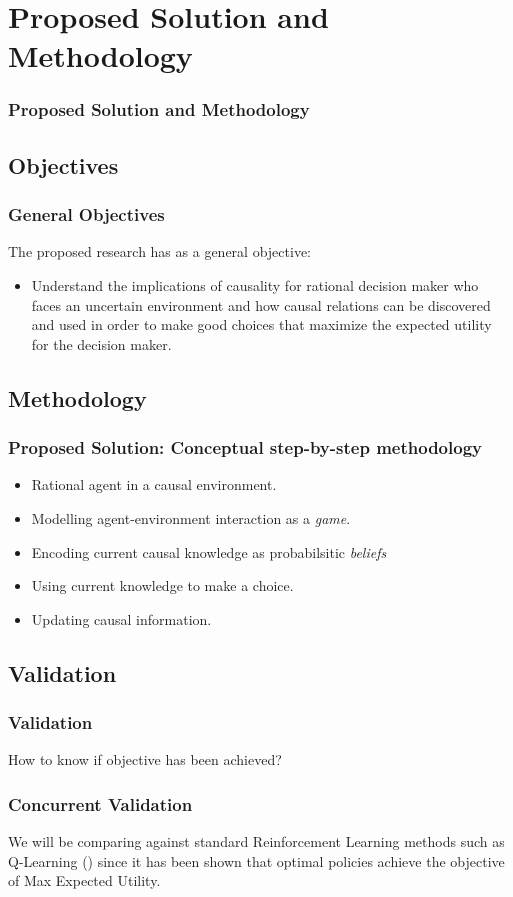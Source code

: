 \documentclass{beamer}
\theoremstyle{plain}
\begin{document}
\section{Proposed Solution and Methodology}
\begin{frame}
\frametitle{Proposed Solution and Methodology}
\end{frame}
	\subsection{Objectives}
	\begin{frame}
	\frametitle{General Objectives}
	The proposed research has as a general objective:
	\begin{itemize}
 \item Understand the implications of causality for rational decision maker who faces an uncertain environment and how causal relations can be discovered and used in order to make good choices that maximize the expected utility for the decision maker.
	\end{itemize}
	\end{frame}
	
\subsection{Methodology}
\begin{frame}
\frametitle{Proposed Solution: Conceptual step-by-step methodology}
\begin{itemize}
\item Rational agent in a causal environment.
\item Modelling agent-environment interaction as a \textit{game}.
\item Encoding current causal knowledge as probabilsitic \textit{beliefs}
\item Using current knowledge to make a choice.
\item Updating causal information.
\end{itemize}
\end{frame}

\subsection{Validation}
\begin{frame}
\frametitle{Validation}
How to know if objective has been achieved?
\end{frame}

\begin{frame}
\frametitle{Concurrent Validation}
We will be comparing against standard Reinforcement Learning methods such as Q-Learning (\cite{watkins1992q}) since it has been shown that optimal policies achieve the objective of Max Expected Utility.
\end{frame}
\end{document}
